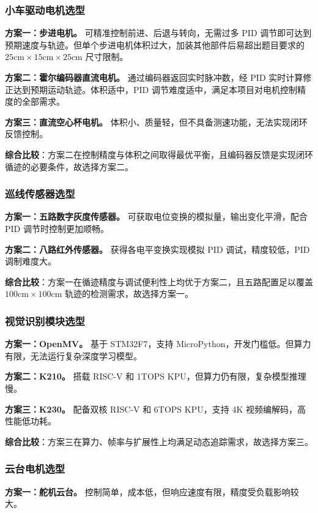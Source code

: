 \documentclass[zihao=-4,fontset=none]{ctexart}
\begin{document}
\subsubsection{小车驱动电机选型}
\textbf{方案一：步进电机。} 可精准控制前进、后退与转向，无需过多 PID 调节即可达到预期速度与轨迹。但单个步进电机体积过大，加装其他部件后易超出题目要求的 $25\text{cm} \times 15\text{cm} \times 25\text{cm}$ 尺寸限制。

\textbf{方案二：霍尔编码器直流电机。} 通过编码器返回实时脉冲数，经 PID 实时计算修正达到预期运动轨迹。体积适中，PID 调节难度适中，满足本项目对电机控制精度的全部需求。

\textbf{方案三：直流空心杯电机。} 体积小、质量轻，但不具备测速功能，无法实现闭环反馈控制。

\textbf{综合比较}：方案二在控制精度与体积之间取得最优平衡，且编码器反馈是实现闭环循迹的必要条件，故选择方案二。

\subsubsection{巡线传感器选型}
\textbf{方案一：五路数字灰度传感器。} 可获取电位变换的模拟量，输出变化平滑，配合 PID 调节时控制更加顺畅。

\textbf{方案二：八路红外传感器。} 获得各电平变换实现模拟 PID 调试，精度较低，PID 调制难度大。

\textbf{综合比较}：方案一在循迹精度与调试便利性上均优于方案二，且五路配置足以覆盖 $100\text{cm} \times 100\text{cm}$ 轨迹的检测需求，故选择方案一。

\subsubsection{视觉识别模块选型}
\textbf{方案一：OpenMV。} 基于 STM32F7，支持 MicroPython，开发门槛低。但算力有限，无法运行复杂深度学习模型。

\textbf{方案二：K210。} 搭载 RISC-V 和 1TOPS KPU，但算力仍有限，复杂模型推理慢。

\textbf{方案三：K230。} 配备双核 RISC-V 和 6TOPS KPU，支持 4K 视频编解码，高性能低功耗。

\textbf{综合比较}：方案三在算力、帧率与扩展性上均满足动态追踪需求，故选择方案三。

\subsubsection{云台电机选型}
\textbf{方案一：舵机云台。} 控制简单，成本低，但响应速度有限，精度受负载影响较大。
\end{document}
